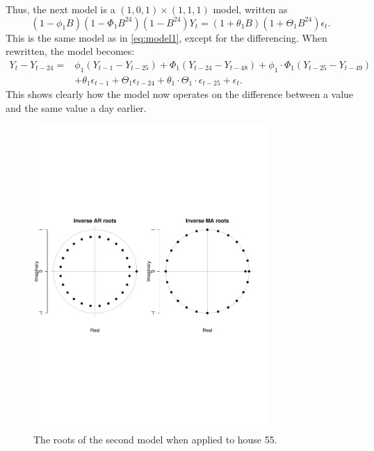 \noindent Thus, the next model is a $(1,0,1)\times(1,1,1)$ model, written as
\begin{equation}
    (1-\phi_1 B)(1-\Phi_1 B^{24})(1-B^{24})Y_t = (1+\theta_1 B)(1+\Theta_1 B^{24}) \epsilon_t.
\end{equation}
This is the same model as in \cref{eq:model1}, except for the differencing. When rewritten, the model becomes:
\begin{align}
    Y_t-Y_{t-24} = &\phi_1 (Y_{t-1}-Y_{t-25}) + \Phi_1 (Y_{t-24}-Y_{t-48}) + \phi_1 \cdot \Phi_1  (Y_{t-25}-Y_{t-49})\\  &+ \theta_1 \epsilon_{t-1} + \Theta_1 \epsilon_{t-24} + \theta_1 \cdot \Theta_1 \cdot \epsilon_{t-25} + \epsilon_t. \nonumber
\end{align}
This shows clearly how the model now operates on the difference between a value and the same value a day earlier.




\begin{figure}
    \centering
    \includegraphics[width=0.8\textwidth]{../../../figures/arimax/Roots_55.pdf}
    \caption{The roots of the second model when applied to house 55.}
    \label{fig:Model2_stationarity55}
\end{figure}    


